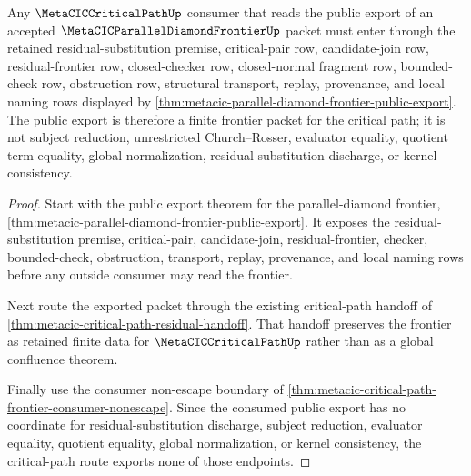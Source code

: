 \begin{theorem}
\label{thm:metacic-critical-path-parallel-diamond-public-export-route}
Any $\MetaCICCriticalPathUp$ consumer that reads the public export of an accepted $\MetaCICParallelDiamondFrontierUp$ packet must enter through the retained residual-substitution premise, critical-pair row, candidate-join row, residual-frontier row, closed-checker row, closed-normal fragment row, bounded-check row, obstruction row, structural transport, replay, provenance, and local naming rows displayed by \autoref{thm:metacic-parallel-diamond-frontier-public-export}. The public export is therefore a finite frontier packet for the critical path; it is not subject reduction, unrestricted Church--Rosser, evaluator equality, quotient term equality, global normalization, residual-substitution discharge, or kernel consistency.
\end{theorem}
\begin{proof}
Start with the public export theorem for the parallel-diamond frontier, \autoref{thm:metacic-parallel-diamond-frontier-public-export}. It exposes the residual-substitution premise, critical-pair, candidate-join, residual-frontier, checker, bounded-check, obstruction, transport, replay, provenance, and local naming rows before any outside consumer may read the frontier.

Next route the exported packet through the existing critical-path handoff of \autoref{thm:metacic-critical-path-residual-handoff}. That handoff preserves the frontier as retained finite data for $\MetaCICCriticalPathUp$ rather than as a global confluence theorem.

Finally use the consumer non-escape boundary of \autoref{thm:metacic-critical-path-frontier-consumer-nonescape}. Since the consumed public export has no coordinate for residual-substitution discharge, subject reduction, evaluator equality, quotient equality, global normalization, or kernel consistency, the critical-path route exports none of those endpoints.
\end{proof}
